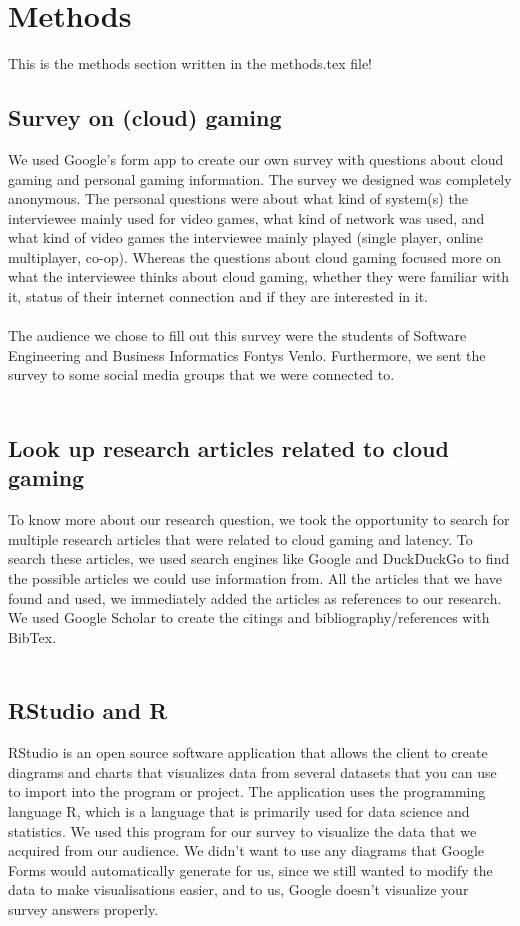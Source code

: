 \section{Methods}
This is the methods section written in the methods.tex file!

\subsection{Survey on (cloud) gaming}
We used Google's form app to create our own survey with questions about cloud gaming and personal gaming information. The survey we designed was completely anonymous. The personal questions were about what kind of system(s) the interviewee mainly used for video games, what kind of network was used, and what kind of video games the interviewee mainly played (single player, online multiplayer, co-op). Whereas the questions about cloud gaming focused more on what the interviewee thinks about cloud gaming, whether they were familiar with it, status of their internet connection and if they are interested in it.
\\\\
The audience we chose to fill out this survey were the students of Software Engineering and Business Informatics Fontys Venlo. Furthermore, we sent the survey to some social media groups that we were connected to.
\\\\
\subsection{Look up research articles related to cloud gaming}
To know more about our research question, we took the opportunity to search for multiple research articles that were related to cloud gaming and latency. To search these articles, we used search engines like Google and DuckDuckGo to find the possible articles we could use information from. All the articles that we have found and used, we immediately added the articles as references to our research. We used Google Scholar to create the citings and bibliography/references with BibTex.
\\\\
\subsection{RStudio and R}
RStudio is an open source software application that allows the client to create diagrams and charts that visualizes data from several datasets that you can use to import into the program or project. The application uses the programming language R, which is a language that is primarily used for data science and statistics. We used this program for our survey to visualize the data that we acquired from our audience. We didn't want to use any diagrams that Google Forms would automatically generate for us, since we still wanted to modify the data to make visualisations easier, and to us, Google doesn't visualize your survey answers properly.